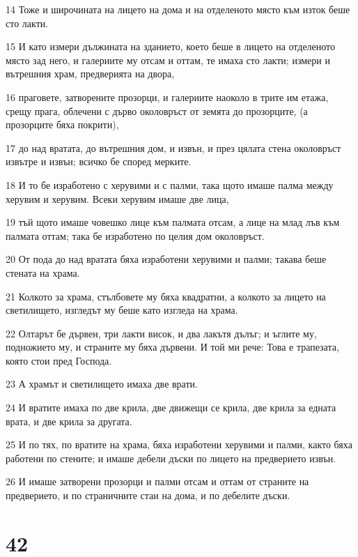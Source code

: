 \par 14 Тоже и широчината на лицето на дома и на отделеното място към изток беше сто лакти.
\par 15 И като измери дължината на зданието, което беше в лицето на отделеното място зад него, и галериите му отсам и оттам, те имаха сто лакти; измери и вътрешния храм, предверията на двора,
\par 16 праговете, затворените прозорци, и галериите наоколо в трите им етажа, срещу прага, облечени с дърво околовръст от земята до прозорците, (а прозорците бяха покрити),
\par 17 до над вратата, до вътрешния дом, и извън, и през цялата стена околовръст извътре и извън; всичко бе според мерките.
\par 18 И то бе изработено с херувими и с палми, така щото имаше палма между херувим и херувим. Всеки херувим имаше две лица,
\par 19 тъй щото имаше човешко лице към палмата отсам, а лице на млад лъв към палмата оттам; така бе изработено по целия дом околовръст.
\par 20 От пода до над вратата бяха изработени херувими и палми; такава беше стената на храма.
\par 21 Колкото за храма, стълбовете му бяха квадратни, а колкото за лицето на светилището, изгледът му беше като изгледа на храма.
\par 22 Олтарът бе дървен, три лакти висок, и два лакътя дълъг; и ъглите му, подножието му, и страните му бяха дървени. И той ми рече: Това е трапезата, която стои пред Господа.
\par 23 А храмът и светилището имаха две врати.
\par 24 И вратите имаха по две крила, две движещи се крила, две крила за едната врата, и две крила за другата.
\par 25 И по тях, по вратите на храма, бяха изработени херувими и палми, както бяха работени по стените; и имаше дебели дъски по лицето на предверието извън.
\par 26 И имаше затворени прозорци и палми отсам и оттам от страните на предверието, и по страничните стаи на дома, и по дебелите дъски.

\chapter{42}

